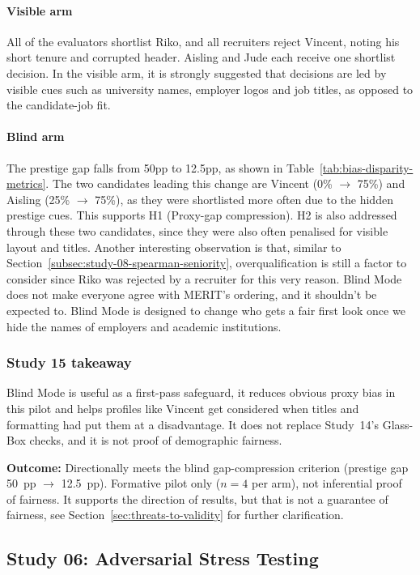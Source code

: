 \paragraph{Visible arm}
All of the evaluators shortlist Riko, and all recruiters reject Vincent, noting his short tenure and corrupted header.
Aisling and Jude each receive one shortlist decision. In the visible arm, it is strongly suggested that decisions are
led by visible cues such as university names, employer logos and job titles, as opposed to the candidate-job fit.

\paragraph{Blind arm}
The prestige gap falls from 50pp to 12.5pp, as shown in Table~\ref{tab:bias-disparity-metrics}.
The two candidates leading this change are Vincent (0\% $\rightarrow$ 75\%) and Aisling (25\% $\rightarrow$ 75\%), as they were shortlisted
more often due to the hidden prestige cues. This supports H1 (Proxy-gap compression). H2 is also addressed through these two candidates,
since they were also often penalised for visible layout and titles. Another interesting observation is that, similar to Section~\ref{subsec:study-08-spearman-seniority},
overqualification is still a factor to consider since Riko was rejected by a recruiter for this very reason. Blind Mode does not
make everyone agree with MERIT's ordering, and it shouldn't be expected to. Blind Mode is designed to change who gets a fair first look
once we hide the names of employers and academic institutions.

\subsubsection{Study 15 takeaway}
Blind Mode is useful as a first-pass safeguard, it reduces obvious proxy bias in this pilot and helps profiles like 
Vincent get considered when titles and formatting had put them at a disadvantage. It does not replace Study~14's Glass-Box 
checks, and it is not proof of demographic fairness.

\textbf{Outcome:} Directionally meets the blind gap-compression criterion (prestige gap 50~pp $\rightarrow$ 12.5~pp).
Formative pilot only ($n = 4$ per arm), not inferential proof of fairness. It supports the direction of results, but that is not a
guarantee of fairness, see Section~\ref{sec:threats-to-validity} for further clarification.

\subsection{Study 06: Adversarial Stress Testing}
\label{subsec:study-06-adversarial}


